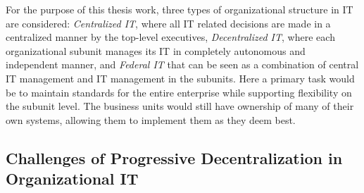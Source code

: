 For the purpose of this thesis work, three types of organizational structure in IT are considered: \textit{Centralized IT}, where all IT related decisions are made in a centralized manner by the top-level executives, \textit{Decentralized IT}, where each organizational subunit manages its IT in completely autonomous and independent manner,  and \textit{Federal IT} that can be seen as a combination of central IT management and IT management in the subunits. Here a primary task  would be to maintain standards for the entire enterprise while supporting flexibility on the subunit level. The business units would still have ownership of many of their own systems, allowing them to implement them as they deem best. 





%
%

\subsection{Challenges of Progressive Decentralization in Organizational IT}
\label{sec:challenge}


